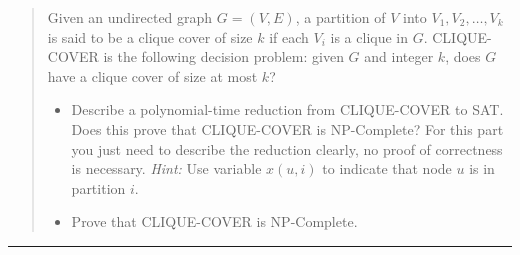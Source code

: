 \documentclass[11pt]{article}
\begin{document}
\begin{quote}
Given an undirected graph $G=(V,E)$, a partition of $V$
  into $V_1,V_2,\ldots,V_k$ is said to be a clique cover of size $k$
  if each $V_i$ is a clique in $G$. CLIQUE-COVER is the following
  decision problem: given $G$ and integer $k$, does $G$ have a clique
  cover of size at most $k$?
  \begin{itemize}
  \item Describe a polynomial-time reduction from CLIQUE-COVER to
    SAT. Does this prove that CLIQUE-COVER is NP-Complete? For this
    part you just need to describe the reduction clearly, no proof of
    correctness is necessary. {\em Hint:} Use variable $x(u,i)$ to
    indicate that node $u$ is in partition $i$.
  \item Prove that CLIQUE-COVER is NP-Complete.
  \end{itemize}
\end{quote}
\hrule
\end{document}

